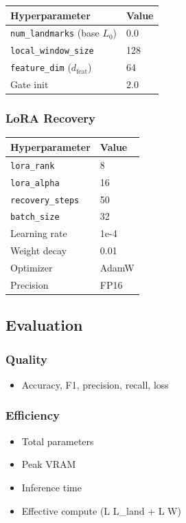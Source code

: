 \begin{table}[H]
\centering
\small
\begin{tabular}{ll}
\toprule
\textbf{Hyperparameter} & \textbf{Value} \\
\midrule
\texttt{num\_landmarks} (base $L_0$) & 0.0 \\
\texttt{local\_window\_size} & 128 \\
\texttt{feature\_dim} ($d_\text{feat}$) & 64 \\
Gate init & 2.0 \\
\bottomrule
\end{tabular}
\end{table}

\subsubsection{LoRA Recovery}

\begin{table}[H]
\centering
\small
\begin{tabular}{ll}
\toprule
\textbf{Hyperparameter} & \textbf{Value} \\
\midrule
\texttt{lora\_rank} & 8 \\
\texttt{lora\_alpha} & 16 \\
\texttt{recovery\_steps} & 50 \\
\texttt{batch\_size} & 32 \\
Learning rate & 1e-4 \\
Weight decay & 0.01 \\
Optimizer & AdamW \\
Precision & FP16 \\
\bottomrule
\end{tabular}
\end{table}

\subsection{Evaluation}

\subsubsection{Quality}
\begin{itemize}
\item Accuracy, F1, precision, recall, loss

\end{itemize}
\subsubsection{Efficiency}
\begin{itemize}
\item Total parameters
\item Peak VRAM
\item Inference time
\item Effective compute (L   L\_land + L   W)

\end{itemize}
